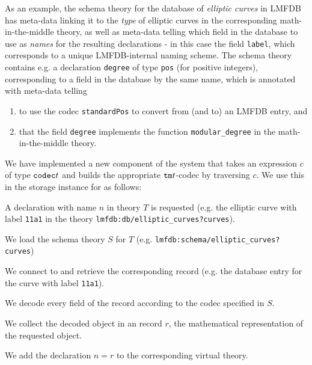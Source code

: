 As an example, the schema theory for the database of \emph{elliptic curves} in LMFDB
has meta-data linking it to the \emph{type} of elliptic curves in the corresponding math-in-the-middle theory, as well as meta-data telling \MMT which field in the database to use as \emph{names} for the resulting \MMT declarations - in this case the field \texttt{label}, which corresponds to a unique LMFDB-internal naming scheme. The schema theory contains e.g. a declaration \texttt{degree} of type \texttt{pos} (for positive  integers), corresponding to a field in the database by the same name, which is annotated with meta-data telling \MMT
\begin{enumerate}
\item to use the codec \texttt{standardPos} to convert from (and to) an LMFDB entry, and
\item that the field \texttt{degree} implements the function \texttt{modular\_degree} in the math-in-the-middle theory.
\end{enumerate}

We have implemented a new component of the \MMT system that takes an expression $c$ of type $\codec t$ and builds the appropriate $\tm t$-codec by traversing $c$.
We use this in the storage instance for \LMFDB as follows:
\begin{compactenum}
 \item A declaration with name $n$ in theory $T$ is requested (e.g. the elliptic curve with label \texttt{11a1} in the theory \texttt{lmfdb:db/elliptic\_curves?curves}).
 \item We load the schema theory $S$ for $T$ (e.g. \texttt{lmfdb:schema/elliptic\_curves?curves})
 \item We connect to \LMFDB and retrieve the corresponding record (e.g. the database entry for the curve with label \texttt{11a1}).
 \item We decode every field of the record according to the codec specified in $S$.
 \item We collect the decoded \MMT object in an \MMT record $r$, the mathematical representation of the requested object.
 \item We add the declaration $n=r$ to the corresponding virtual theory.
\end{compactenum}

 

